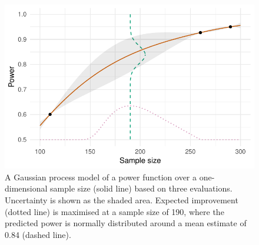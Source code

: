 \documentclass{article} %
\begin{document}
\begin{figure}
\centering
\includegraphics[scale=0.8]{./Figures/GP_example}
\caption{A Gaussian process model of a power function over a one-dimensional sample size (solid line) based on three evaluations. Uncertainty is shown as the shaded area. Expected improvement (dotted line) is maximised at a sample size of 190, where the predicted power is normally distributed around a mean estimate of 0.84 (dashed line).}
\label{fig:GP_example}
\end{figure}


\end{document}
